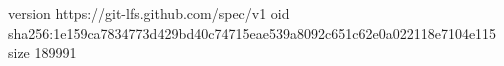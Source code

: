 version https://git-lfs.github.com/spec/v1
oid sha256:1e159ca7834773d429bd40c74715eae539a8092c651c62e0a022118e7104e115
size 189991

